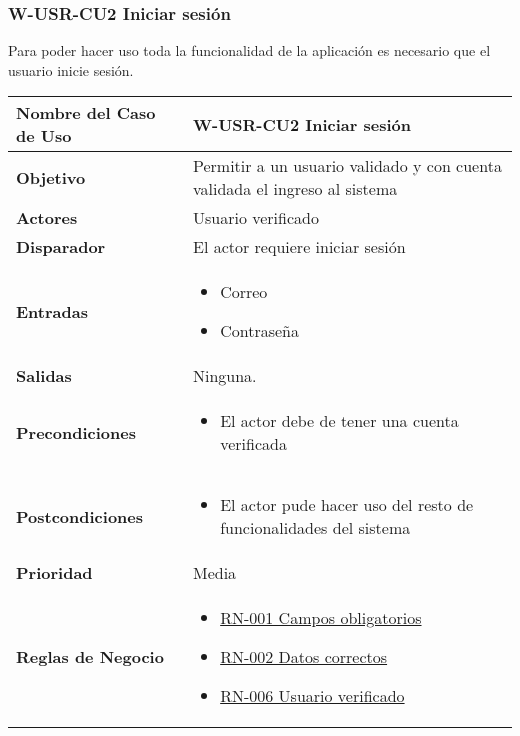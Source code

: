 \subsubsection{W-USR-CU2 Iniciar sesión}
Para poder hacer uso toda la funcionalidad de la aplicación es necesario que el usuario inicie sesión.
\begin{longtable}{|J{5cm}|J{10.3cm}|}
	\hline
	\textbf{Nombre del Caso de Uso} &
		W-USR-CU2 Iniciar sesión \\ \hline
	\textbf{Objetivo} &
		Permitir a un usuario validado y con cuenta validada el ingreso al sistema \\ \hline
	\textbf{Actores} &
		Usuario verificado \\ \hline 
	\textbf{Disparador} & 
		El actor requiere iniciar sesión \\ \hline 
	\textbf{Entradas} & 
		\begin{itemize}
				\item Correo
				\item Contraseña
		\end{itemize}\\ \hline 
	\textbf{Salidas} & 
		Ninguna. \\ \hline
	\textbf{Precondiciones} &
		\begin{itemize}
				\item El actor debe de tener una cuenta verificada
		\end{itemize} \\ \hline
	\textbf{Postcondiciones} &
		\begin{itemize}
			\item El actor pude hacer uso del resto de funcionalidades del sistema
		\end{itemize}\\ \hline
	\textbf{Prioridad} & 
		Media \\ \hline
	\textbf{Reglas de Negocio} & 
		\begin{itemize}
			\item \hyperref[RN001]{RN-001 Campos obligatorios}
			\item \hyperref[RN002]{RN-002 Datos correctos}
			\item \hyperref[RN006]{RN-006 Usuario verificado}
		\end{itemize} \\ \hline

\end{longtable}
